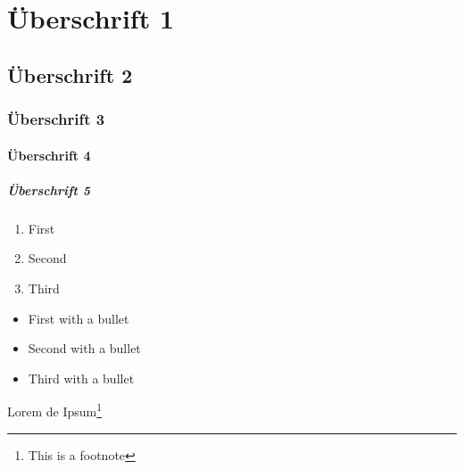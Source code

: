 \label{sec:ueberschrift1}
\section{Überschrift 1}

\label{subsec:ueberschrift12}
\subsection{Überschrift 2}

\label{subsubsec:ueberschrift3}
\subsubsection{Überschrift 3}

\label{para:ueberschrift4}
\paragraph{Überschrift 4}

\label{para:ueberschrift5}
\subparagraph{Überschrift 5}


\begin{enumerate}[itemsep=0pt] %
	\item First
	\item Second
	\item Third
\end{enumerate}

\begin{itemize}[itemsep=25pt] %
	\item First with a bullet
	\item Second with a bullet
	\item Third with a bullet
\end{itemize}

Lorem de Ipsum\footnote{This is a footnote}